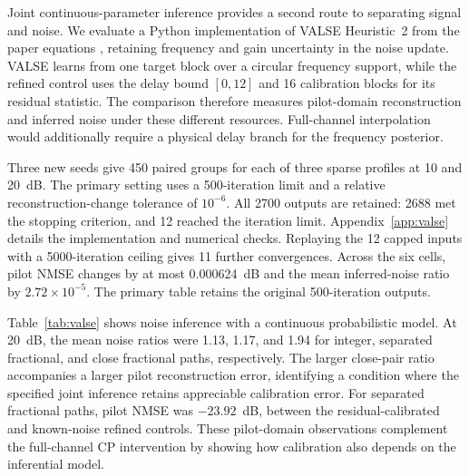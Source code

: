 Joint continuous-parameter inference provides a second route to separating
signal and noise. We evaluate a Python implementation of VALSE Heuristic~2
from the paper equations \cite{badiu2017valse}, retaining frequency and gain
uncertainty in the noise update. VALSE learns from one target block over a
circular frequency support, while the refined control uses the delay bound
$[0,12]$ and 16 calibration blocks for its residual statistic. The comparison
therefore measures pilot-domain reconstruction and inferred noise under these
different resources. Full-channel interpolation would additionally require a
physical delay branch for the frequency posterior.

Three new seeds give 450 paired groups for each of three sparse profiles
at 10 and 20~dB. The primary setting uses a 500-iteration limit and a relative
reconstruction-change tolerance of $10^{-6}$. All 2700 outputs are retained:
2688 met the stopping criterion, and 12 reached the iteration limit.
Appendix~\ref{app:valse} details the implementation and numerical checks.
Replaying the 12 capped inputs with a 5000-iteration ceiling gives 11 further
convergences. Across the six cells, pilot NMSE changes by at most
0.000624~dB and the mean inferred-noise ratio by $2.72\times10^{-5}$.
The primary table retains the original 500-iteration outputs.



Table~\ref{tab:valse} shows noise inference with a continuous probabilistic
model. At 20~dB, the mean noise ratios were 1.13, 1.17, and 1.94 for integer,
separated fractional, and close fractional paths, respectively. The larger
close-pair ratio accompanies a larger pilot reconstruction error, identifying
a condition where the specified joint inference retains appreciable calibration
error. For separated fractional paths, pilot NMSE was $-23.92$~dB,
between the residual-calibrated and known-noise refined controls. These
pilot-domain observations complement the full-channel CP intervention by
showing how calibration also depends on the inferential model.
